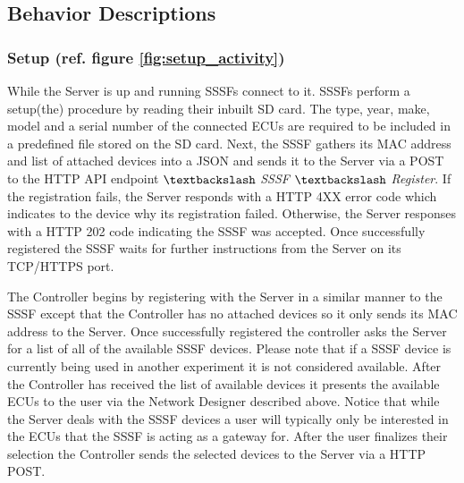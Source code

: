 \documentclass[letterpaper,twocolumn,12pt]{article}
\begin{document}
\subsection{Behavior Descriptions}
\subsubsection{Setup (ref. figure \ref{fig:setup_activity})}
While the Server is up and running SSSFs connect to it. SSSFs perform a setup(the) procedure by reading their inbuilt SD card. The type, year, make, model and a serial number of the connected ECUs are required to be included in a predefined file stored on the SD card. 
Next, the SSSF gathers its MAC address and list of attached devices into a JSON and sends it to the Server via a POST to the HTTP API endpoint $\textbackslash$ \textit{SSSF} $\textbackslash$ \textit{Register}. 
If the registration fails, the Server responds with a HTTP 4XX error code which indicates to the device why its registration failed. Otherwise, the Server responses with a HTTP 202 code indicating the SSSF was accepted. Once successfully registered the SSSF waits for further instructions from the Server on its TCP/HTTPS port. 

The Controller begins by registering with the Server in a similar manner to the SSSF except that the Controller has no attached devices so it only sends its MAC address to the Server.
Once successfully registered the controller asks the Server for a list of all of the available SSSF devices. Please note that if a SSSF device is currently being used in another experiment it is not considered available. After the Controller has received the list of available devices it presents the available ECUs to the user via the Network Designer described above. Notice that while the Server deals with the SSSF devices a user will typically only be interested in the ECUs that the SSSF is acting as a gateway for. After the user finalizes their selection the Controller sends the selected devices to the Server via a HTTP POST.
\end{document}
